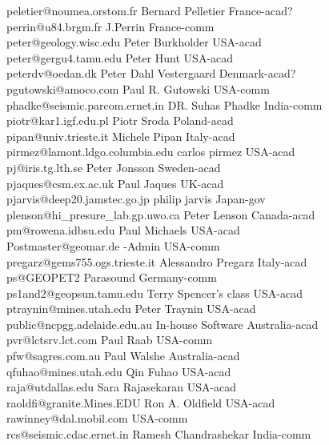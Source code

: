 \begin{tabbing}
peletier@noumea.orstom.fr  \>  Bernard Pelletier \>   France-acad? \\
perrin@u84.brgm.fr  \>  J.Perrin  \>   France-comm \\
peter@geology.wisc.edu \> Peter Burkholder \> USA-acad\\
peter@gergu4.tamu.edu \> Peter Hunt \> USA-acad\\
peterdv@oedan.dk \> Peter Dahl Vestergaard \> Denmark-acad?\\
pgutowski@amoco.com \> Paul R. Gutowski \> USA-comm\\
phadke@seismic.parcom.ernet.in \> DR. Suhas Phadke \> India-comm\\
piotr@kar1.igf.edu.pl \> Piotr Sroda \> Poland-acad\\
pipan@univ.trieste.it \> Michele Pipan \> Italy-acad\\
pirmez@lamont.ldgo.columbia.edu \> carlos pirmez \> USA-acad\\
pj@iris.tg.lth.se \> Peter Jonsson \> Sweden-acad\\
pjaques@csm.ex.ac.uk \> Paul Jaques \> UK-acad\\
pjarvis@deep20.jamstec.go.jp \> philip jarvis \> Japan-gov\\
plenson@hi\_presure\_lab.gp.uwo.ca \> Peter Lenson \> Canada-acad\\
pm@rowena.idbsu.edu \> Paul Michaels \>  USA-acad\\
Postmaster@geomar.de -Admin \> USA-comm\\
pregarz@gems755.ogs.trieste.it \> Alessandro Pregarz \> Italy-acad\\
ps@GEOPET2 \> Parasound \> Germany-comm\\
ps1and2@geopsun.tamu.edu \> Terry Spencer's class \> USA-acad\\
ptraynin@mines.utah.edu \> Peter Traynin \> USA-acad\\
public@ncpgg.adelaide.edu.au \> In-house Software \> Australia-acad\\
pvr@lctsrv.lct.com \> Paul Raab \> USA-comm\\
pfw@sagres.com.au \> Paul Walshe \> Australia-acad\\
qfuhao@mines.utah.edu \> Qin Fuhao \>  USA-acad\\
raja@utdallas.edu \> Sara Rajasekaran \> USA-acad\\
raoldfi@granite.Mines.EDU \> Ron A. Oldfield \> USA-acad\\
rawinney@dal.mobil.com \> \> USA-comm\\
rcs@seismic.cdac.ernet.in \> Ramesh Chandrashekar \> India-comm\\

\end{tabbing}
